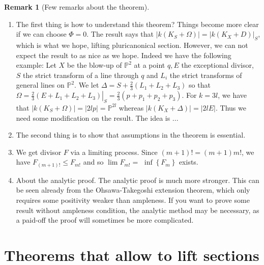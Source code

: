 \documentclass[11pt]{article}
\theoremstyle{definition}
\newtheorem{remark}[theorem]{Remark}
\begin{document}
	\begin{remark}[Few remarks about the theorem]~\\
		\begin{enumerate}
			\item The first thing is how to understand this theorem? Things become more clear if we can choose $\Phi = 0$. The result says that $|k(K_S+\Omega)| = |k(K_X+D)|_S$, which is what we hope, lifting pluricanonical section. However, we can not expect the result to as nice as we hope. Indeed we have the following example: Let $X$ be the blow-up of $\mathbb{P}^2$ at a point $q, E$ the exceptional divisor, $S$ the strict transform of a line through $q$ and $L_i$ the strict transforms of general lines on $\mathbb{P}^2$. We let $\Delta=S+\frac{2}{3}\left(L_1+L_2+L_3\right)$ so that $\Omega=\left.\frac{2}{3}\left(E+L_1+L_2+L_3\right)\right|_S=\frac{2}{3}\left(p+p_1+p_2+p_3\right)$. For $k=3 l$, we have that $\left|k\left(K_S+\Omega\right)\right|=|2 l p|=\mathbb{P}^{2 l}$ whereas $\left|k\left(K_X+\Delta\right)\right|=|2 l E|$. Thus we need some modification on the result. The idea is ...
			\item The second thing is to show that assumptions in the theorem is essential. 
			\item We get divisor $F$ via a limiting process. Since $(m+1)!=(m+1) m!$, we have $F_{(m+1)!} \leq F_{m!}$ and so $\lim F_{m!}=$ $\inf \left\{F_m\right\}$ exists.
			\item About the analytic proof. The analytic proof is much more stronger. This can be seen already from the Ohsawa-Takegoshi extension theorem, which only requires some positivity weaker than ampleness. If you want to prove some result without ampleness condition, the analytic method may be necessary, as a paid-off the proof will sometimes be more complicated.
		\end{enumerate}
	\end{remark}
	
	\section{Theorems that allow to lift sections}
	
\end{document}
